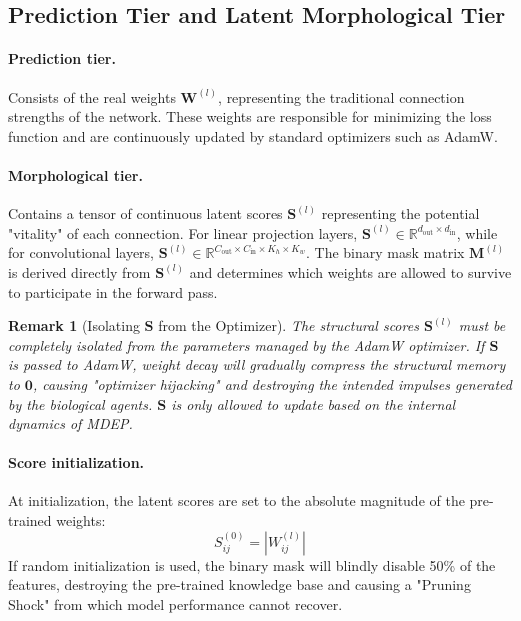 \documentclass[letterpaper]{article} %
\newcommand{\R}{\mathbb{R}}
\newtheorem{remark}{Remark}
\begin{document}
\subsection{Prediction Tier and Latent Morphological Tier}\label{subsec:two_tiers}

\paragraph{Prediction tier.}
Consists of the real weights $\bm{W}^{(l)}$, representing the traditional connection strengths of the network. These weights are responsible for minimizing the loss function and are continuously updated by standard optimizers such as AdamW.

\paragraph{Morphological tier.}
Contains a tensor of continuous latent scores $\bm{S}^{(l)}$ representing the potential "vitality" of each connection. For linear projection layers, $\bm{S}^{(l)} \in \R^{d_{\text{out}} \times d_{\text{in}}}$, while for convolutional layers, $\bm{S}^{(l)} \in \R^{C_{\text{out}} \times C_{\text{in}} \times K_h \times K_w}$. The binary mask matrix $\bm{M}^{(l)}$ is derived directly from $\bm{S}^{(l)}$ and determines which weights are allowed to survive to participate in the forward pass.

\begin{remark}[Isolating $\bm{S}$ from the Optimizer]
The structural scores $\bm{S}^{(l)}$ must be completely isolated from the parameters managed by the AdamW optimizer. If $\bm{S}$ is passed to AdamW, weight decay will gradually compress the structural memory to $\bm{0}$, causing "optimizer hijacking" and destroying the intended impulses generated by the biological agents. $\bm{S}$ is only allowed to update based on the internal dynamics of MDEP.
\end{remark}

\paragraph{Score initialization.}
At initialization, the latent scores are set to the absolute magnitude of the pre-trained weights:
\begin{equation}\label{eq:score_init}
    S_{ij}^{(0)} = |W_{ij}^{(l)}|
\end{equation}
If random initialization is used, the binary mask will blindly disable 50\% of the features, destroying the pre-trained knowledge base and causing a "Pruning Shock" from which model performance cannot recover.
\end{document}
